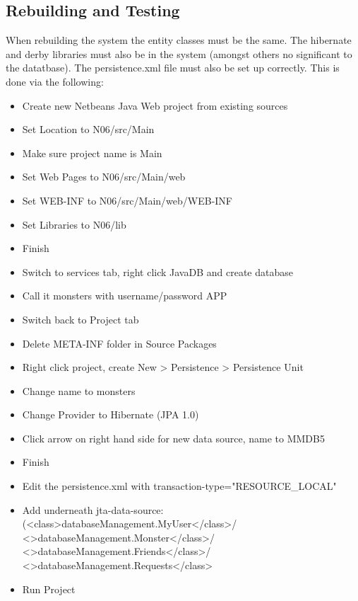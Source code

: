 \documentclass[titlepage]{article}
\begin{document}
{\subsection{Rebuilding and Testing}
When rebuilding the system the entity classes must be the same. The hibernate and derby libraries must also be in the system (amongst others no significant to the datatbase). The persistence.xml file must also be set up correctly. This is done via the following:
\begin{itemize}
\item {Create new Netbeans Java Web project from existing sources}
\item {Set Location to N06/src/Main}
\item {Make sure project name is Main}
\item {Set Web Pages to N06/src/Main/web}
\item {Set WEB-INF to N06/src/Main/web/WEB-INF}
\item {Set Libraries to N06/lib}
\item {Finish}
\item {Switch to services tab, right click JavaDB and create database}
\item {Call it monsters with username/password APP}
\item {Switch back to Project tab}
\item {Delete META-INF folder in Source Packages}
\item {Right click project, create New > Persistence > Persistence Unit}
\item {Change name to monsters}
\item {Change Provider to Hibernate (JPA 1.0)}
\item {Click arrow on right hand side for new data source, name to MMDB5}
\item {Finish}
\item {Edit the persistence.xml with transaction-type="RESOURCE\_LOCAL"}
\item {Add underneath jta-data-source: (\textless class\textgreater databaseManagement.MyUser\textless/class\textgreater / \textless\textgreater databaseManagement.Monster\textless/class\textgreater / \textless\textgreater databaseManagement.Friends\textless/class\textgreater / \textless\textgreater databaseManagement.Requests\textless/class\textgreater}
\item {Run Project}
\end{itemize}
}
\end{document}
